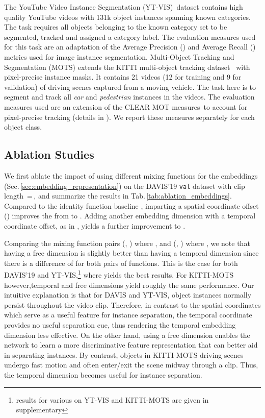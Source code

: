 \documentclass[runningheads]{llncs}
\newcommand{\refsec}[1]{Sec.\,\ref{sec:#1}}
\newcommand{\reftab}[1]{Tab.\,\ref{tab:#1}}
\newcommand{\PAR}[1]{\vskip4pt \noindent {\bf #1~}}
\begin{document}
\PAR{YouTube-VIS:} The YouTube Video Instance Segmentation (YT-VIS)\,\cite{Yang19ICCV} dataset contains  high quality YouTube videos with 131k object instances spanning  known categories. 
The task requires all objects belonging to the known category set to be segmented, tracked and assigned a category label.
The evaluation measures used for this task are an adaptation of the Average Precision () and Average Recall () metrics used for image instance segmentation. 
\PAR{KITTI-MOTS:} Multi-Object Tracking and Segmentation (MOTS) \cite{Voigtlaender19CVPR} extends the KITTI multi-object tracking dataset~\cite{Geiger12CVPR} with pixel-precise instance masks. 
It contains 21 videos (12 for training and 9 for validation) of driving scenes captured from a moving vehicle. The task here is to segment and track all \textit{car} and \textit{pedestrian} instances in the videos. The evaluation measures used are an extension of the CLEAR MOT measures\,\cite{Bernardin08JIVP} to account for pixel-precise tracking (details in \cite{Voigtlaender19CVPR}). We report these measures separately for each object class.

\subsection{Ablation Studies}

\PAR{Embedding formulation:}
We first ablate the impact of using different mixing functions for the embeddings (\refsec{embedding_representation}) on the DAVIS'19 \texttt{val} dataset with clip length \,=\,, and summarize the results in \reftab{ablation_embeddings}. 
Compared to the identity function baseline , imparting a spatial coordinate offset () improves the  from  to . 
Adding another embedding dimension with a temporal coordinate offset, as in , yields a further improvement to . 

Comparing the mixing function pairs (, ) where , and (, ) where , we note that having a free dimension is slightly better than having a temporal dimension since there is a difference of   for both pairs of functions. 
This is the case for both DAVIS'19 and YT-VIS,\footnote{\label{fnote:embedding_formulation}results for various  on YT-VIS and KITTI-MOTS are given in supplementary} where  yields the best results. For KITTI-MOTS however,\footnotemark[\value{footnote}] temporal and free dimensions yield roughly the same performance. Our intuitive explanation is that for DAVIS and YT-VIS, object instances normally persist throughout the video clip. 
Therefore, in contrast to the spatial coordinates which serve as a useful feature for instance separation, the temporal coordinate provides no useful separation cue, thus rendering the temporal embedding dimension less effective. 
On the other hand, using a free dimension enables the network to learn a more discriminative feature representation that can better aid in separating instances. 
By contrast, objects in KITTI-MOTS driving scenes undergo fast motion and often enter/exit the scene midway through a clip. Thus, the temporal dimension becomes useful for instance separation.
\end{document}
